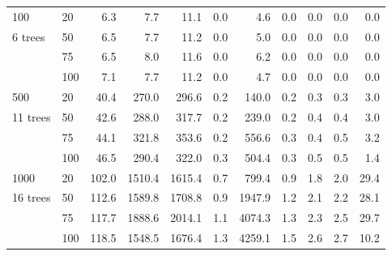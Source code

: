 \begin{table}[htb!]
\begin{adjustbox}{width=1\textwidth}
\begin{tabular}{llrrrrrrrrr}
100  & 20  &     6.3 &    7.7 &              11.1 &           0.0 &            4.6 &             0.0 &                     0.0 &                0.0 &                0.0 \\
     6 trees & 50  &     6.5 &    7.7 &              11.2 &           0.0 &            5.0 &             0.0 &                     0.0 &                0.0 &                0.0 \\
     & 75  &     6.5 &    8.0 &              11.6 &           0.0 &            6.2 &             0.0 &                     0.0 &                0.0 &                0.0 \\
     & 100 &     7.1 &    7.7 &              11.2 &           0.0 &            4.7 &             0.0 &                     0.0 &                0.0 &                0.0 \\
     \hline
{500}  & 20  &    40.4 &  270.0 &             296.6 &           0.2 &          140.0 &             0.2 &                     0.3 &                0.3 &                3.0 \\
     11 trees& 50  &    42.6 &  288.0 &             317.7 &           0.2 &          239.0 &             0.2 &                     0.4 &                0.4 &                3.0 \\
     & 75  &    44.1 &  321.8 &             353.6 &           0.2 &          556.6 &             0.3 &                     0.4 &                0.5 &                3.2 \\
     & 100 &    46.5 &  290.4 &             322.0 &           0.3 &          504.4 &             0.3 &                     0.5 &                0.5 &                1.4 \\
     \hline
{1000} & 20  &   102.0 & 1510.4 &            1615.4 &           0.7 &          799.4 &             0.9 &                     1.8 &                2.0 &               29.4 \\
 16 trees    & 50  &   112.6 & 1589.8 &            1708.8 &           0.9 &         1947.9 &             1.2 &                     2.1 &                2.2 &               28.1 \\
     & 75  &   117.7 & 1888.6 &            2014.1 &           1.1 &         4074.3 &             1.3 &                     2.3 &                2.5 &               29.7 \\
     & 100 &   118.5 & 1548.5 &            1676.4 &           1.3 &         4259.1 &             1.5 &                     2.6 &                2.7 &               10.2 \\
\end{tabular}

\end{adjustbox}
\end{table}
